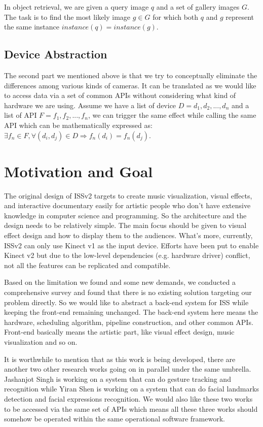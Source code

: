 In object retrieval, we are given a query image $q$ and a set of gallery images
$G$. The task is to find the
most likely image $g \in G$ for which both $q$ and $g$ represent the same 
instance $instance(q) = instance(g)$.

\subsection{Device Abstraction}

The second part we mentioned above is that we try to conceptually eliminate the 
differences among various kinds of cameras. It can be translated as we would 
like to access data via a set of common APIs without considering what kind of 
hardware
we are using. Assume we have a list of device $D = {d_1, d_2, ..., d_n}$ and a
list of API $F = {f_1, f_2, ..., f_n}$,
we can trigger the same effect while calling the same API which can be 
mathematically expressed as:
$
\exists f_n \in F, \forall (d_i, d_j) \in D
\Longrightarrow f_{n}(d_i) = f_{n}(d_j)
$.

\section{Motivation and Goal}
\label{sec:intro-mot-goal}

The original design of ISSv2 targets to create music visualization, visual
effects, and interactive documentary easily for artistic people who don't have 
extensive knowledge in computer science and programming. So the architecture and
the design needs to be relatively simple. The main focus should be given to visual effect
design and how to display them to the audiences.
What's more, currently, ISSv2 can only use Kinect v1 as the input device. Efforts have
been put to enable Kinect v2 but due to the low-level dependencies (e.g.
hardware driver) conflict, not all the features can be replicated and compatible.

Based on the limitation we found and some new demands,
we conducted a comprehensive survey and found that there is no existing solution
targeting our problem directly.
So we would like to abstract a back-end system for ISS while keeping the
front-end remaining unchanged. The back-end system here means the hardware,
scheduling algorithm, pipeline construction, and other common APIs. Front-end
basically means the artistic part, like visual effect design, music
visualization and so on.

It is worthwhile to mention that as this work is being developed, there are
another two other research works going on in parallel under the same umbrella.
Jashanjot Singh is working on a system that can do gesture tracking and
recognition while Yiran Shen is working on a system that can do facial
landmarks detection and facial expressions recognition. We would also like
these two works to be accessed via the same set of APIs which means all these
three works should somehow be operated within the same operational software
framework.

